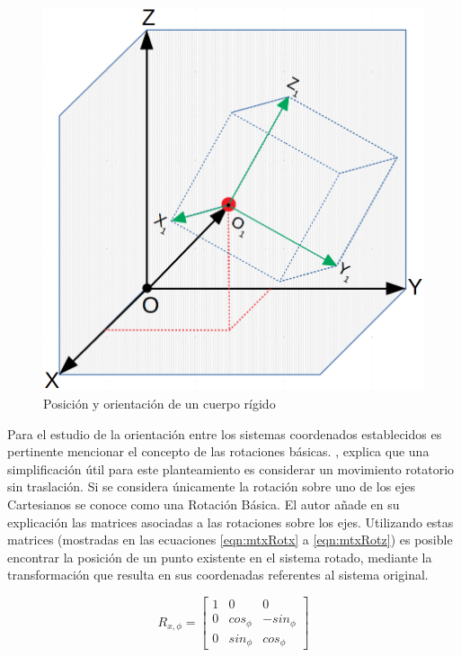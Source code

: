 \begin{figure}[ht]
\centering
\includegraphics[scale= 0.2]{Figures/RigidBodyPos.png}
    \caption{Posición y orientación de un cuerpo rígido}
    \label{fig:RigidBodyPos}
\end{figure}

Para el estudio de la orientación entre los sistemas coordenados establecidos es pertinente mencionar el concepto de las rotaciones básicas. \cite{olguin_diaz_3d_2019}, explica que una simplificación útil para este planteamiento es considerar un movimiento rotatorio sin traslación. Si se considera únicamente la rotación sobre uno de los ejes Cartesianos se conoce como una Rotación Básica. El autor añade en su explicación las matrices asociadas a las rotaciones sobre los ejes. Utilizando estas matrices (mostradas en las ecuaciones \ref{eqn:mtxRotx} a \ref{eqn:mtxRotz}) es posible encontrar la posición de un punto existente en el sistema rotado, mediante la transformación que resulta en sus coordenadas referentes al sistema original.

\begin{equation}
    R_{x,\phi}=\begin{bmatrix}
    1 & 0 & 0\\
    0 & cos_{\phi} & -sin_{\phi}\\
    0 & sin_{\phi} & cos_{\phi}
    \end{bmatrix}
    \label{eqn:mtxRotx}
\end{equation}

